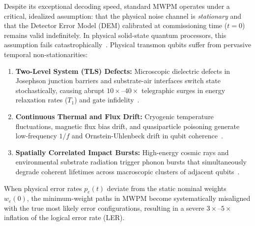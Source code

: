 \documentclass[aps,prxquantum,reprint,superscriptaddress,floatfix,nofootinbib]{revtex4-2}
\begin{document}
Despite its exceptional decoding speed, standard MWPM operates under a critical, idealized assumption: that the physical noise channel is \emph{stationary} and that the Detector Error Model (DEM) calibrated at commissioning time ($t=0$) remains valid indefinitely. In physical solid-state quantum processors, this assumption fails catastrophically~\cite{klimov2018fluctuations,burnett2019decoherence,mcrae2020reproducible,muller2019towards}. Physical transmon qubits suffer from pervasive temporal non-stationarities:
\begin{enumerate}
    \item \textbf{Two-Level System (TLS) Defects:} Microscopic dielectric defects in Josephson junction barriers and substrate-air interfaces switch state stochastically, causing abrupt $10\times\text{--}40\times$ telegraphic surges in energy relaxation rates ($T_1$) and gate infidelity~\cite{klimov2018fluctuations,burnett2019decoherence}.
    \item \textbf{Continuous Thermal and Flux Drift:} Cryogenic temperature fluctuations, magnetic flux bias drift, and quasiparticle poisoning generate low-frequency $1/f$ and Ornstein-Uhlenbeck drift in qubit coherence~\cite{muller2019towards}.
    \item \textbf{Spatially Correlated Impact Bursts:} High-energy cosmic rays and environmental substrate radiation trigger phonon bursts that simultaneously degrade coherent lifetimes across macroscopic clusters of adjacent qubits~\cite{vepsalainen2020impact,wilen2021correlated}.
\end{enumerate}

When physical error rates $p_e(t)$ deviate from the static nominal weights $w_e(0)$, the minimum-weight paths in MWPM become systematically misaligned with the true most likely error configurations, resulting in a severe $3\times\text{--}5\times$ inflation of the logical error rate (LER).
\end{document}

